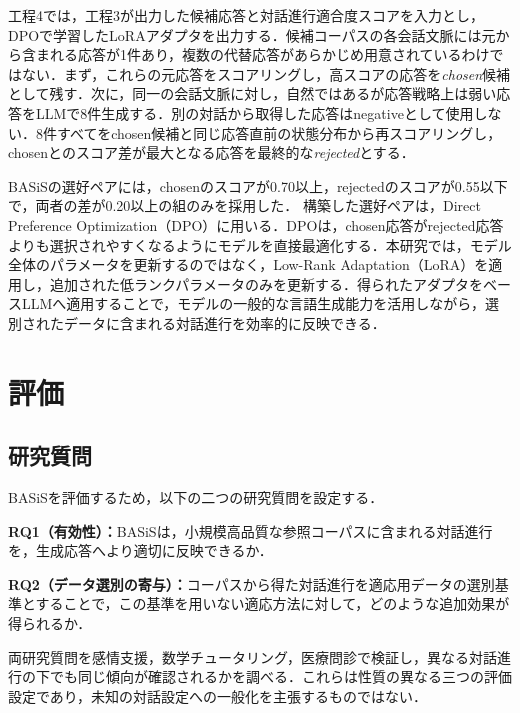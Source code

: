\documentclass[manuscript,review,anonymous]{acmart}
\begin{document}
\begingroup
\setlength{\emergencystretch}{3em}
工程4では，工程3が出力した候補応答と対話進行適合度スコアを入力とし，DPOで学習したLoRAアダプタを出力する．候補コーパスの各会話文脈には元から含まれる応答が1件あり，複数の代替応答があらかじめ用意されているわけではない．まず，これらの元応答をスコアリングし，高スコアの応答を\emph{chosen}候補として残す．次に，同一の会話文脈に対し，自然ではあるが応答戦略上は弱い応答をLLMで8件生成する．別の対話から取得した応答はnegativeとして使用しない．8件すべてをchosen候補と同じ応答直前の状態分布から再スコアリングし，chosenとのスコア差が最大となる応答を最終的な\emph{rejected}とする．

BASiSの選好ペアには，chosenのスコアが0.70以上，rejectedのスコアが0.55以下で，両者の差が0.20以上の組のみを採用した．
構築した選好ペアは，Direct Preference Optimization（DPO）\cite{rafailov2023dpo}に用いる．DPOは，chosen応答がrejected応答よりも選択されやすくなるようにモデルを直接最適化する．本研究では，モデル全体のパラメータを更新するのではなく，Low-Rank Adaptation（LoRA）\cite{hu2021lora}を適用し，追加された低ランクパラメータのみを更新する．得られたアダプタをベースLLMへ適用することで，モデルの一般的な言語生成能力を活用しながら，選別されたデータに含まれる対話進行を効率的に反映できる．
\par
\endgroup


\section{評価}
\label{sec:evaluation}
\label{sec:setup}

\subsection{研究質問}
\label{sec:eval_objectives}

BASiSを評価するため，以下の二つの研究質問を設定する．

\noindent\textbf{RQ1（有効性）：}BASiSは，小規模高品質な参照コーパスに含まれる対話進行を，生成応答へより適切に反映できるか．

\noindent\textbf{RQ2（データ選別の寄与）：}コーパスから得た対話進行を適応用データの選別基準とすることで，この基準を用いない適応方法に対して，どのような追加効果が得られるか．

両研究質問を感情支援，数学チュータリング，医療問診で検証し，異なる対話進行の下でも同じ傾向が確認されるかを調べる．これらは性質の異なる三つの評価設定であり，未知の対話設定への一般化を主張するものではない．
\end{document}
